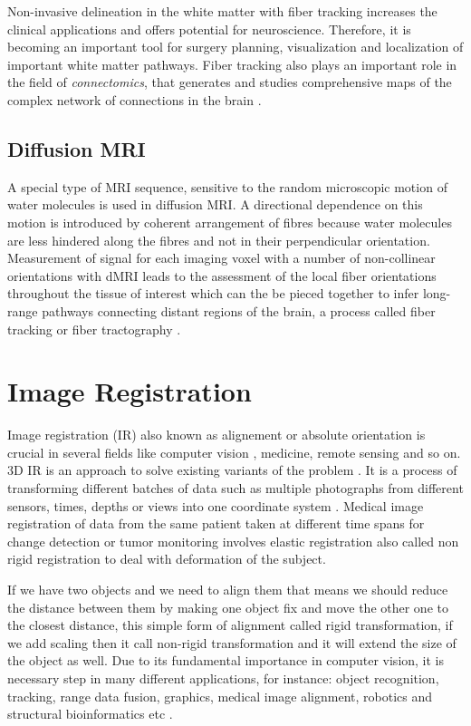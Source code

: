 \documentclass[../structure.tex]{subfiles}
\begin{document}
Non-invasive delineation in the white matter with fiber tracking increases the clinical applications and offers potential for neuroscience. Therefore, it is becoming an important tool for surgery planning, visualization and localization of important white matter pathways. Fiber tracking also plays an important role in the field of \textit{connectomics}, that generates and studies comprehensive maps of the complex network of connections in the brain \cite{Jeurissen2017}.

\subsection{Diffusion MRI}

A special type of MRI sequence, sensitive to the random microscopic motion of water molecules is used in diffusion MRI. A directional dependence on this motion is introduced by coherent arrangement of fibres because water molecules are less hindered along the fibres and not in their perpendicular orientation. Measurement of signal for each imaging voxel with a number of non-collinear orientations with dMRI leads to the assessment of the local fiber orientations throughout the tissue of interest which can the be pieced together to infer long-range pathways connecting distant regions of the brain, a process called fiber tracking or fiber tractography \cite{Jeurissen2017}.

\section{Image Registration}

Image registration (IR) also known as alignement or absolute orientation is crucial in several fields like computer vision , medicine, remote sensing and so on. 3D IR is an approach to solve existing variants of the problem \cite{Cordon2006}. It is a process of transforming different batches of data such as multiple photographs from different sensors, times, depths or views into one coordinate system . Medical image registration of data from the same patient taken at different time spans for change detection or tumor monitoring involves elastic registration also called non rigid registration to deal with deformation of the subject.


If we have two objects and we need to align them that means we should reduce the distance between them by making one object fix and move the other one to the closest distance, this simple form of alignment called rigid transformation, if we add scaling then it call non-rigid transformation and it will extend the size of the object as well. Due to its fundamental importance in computer vision, it is necessary step in many different applications, for instance: object recognition, tracking, range data fusion, graphics, medical image alignment, robotics and structural bioinformatics etc \cite{Li2007}.
\end{document}
